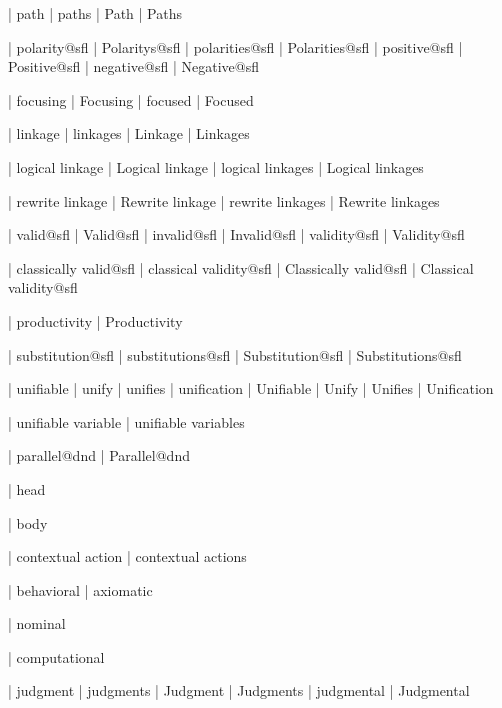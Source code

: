  | path
 | paths
 | Path
 | Paths

 | polarity@sfl
 | Polaritys@sfl
 | polarities@sfl
 | Polarities@sfl
 | positive@sfl
 | Positive@sfl
 | negative@sfl
 | Negative@sfl

 | focusing
 | Focusing
 | focused
 | Focused

 | linkage
 | linkages
 | Linkage
 | Linkages

 | logical linkage
 | Logical linkage
 | logical linkages
 | Logical linkages

 | rewrite linkage
 | Rewrite linkage
 | rewrite linkages
 | Rewrite linkages

 | valid@sfl
 | Valid@sfl
 | invalid@sfl
 | Invalid@sfl
 | validity@sfl
 | Validity@sfl

 | classically valid@sfl
 | classical validity@sfl
 | Classically valid@sfl
 | Classical validity@sfl

 | productivity
 | Productivity
 
 | substitution@sfl
 | substitutions@sfl
 | Substitution@sfl
 | Substitutions@sfl

 | unifiable
 | unify
 | unifies
 | unification
 | Unifiable
 | Unify
 | Unifies
 | Unification

 | unifiable variable
 | unifiable variables

 | parallel@dnd
 | Parallel@dnd




 | head

 | body

 | contextual action
 | contextual actions
 
 | behavioral
 | axiomatic

 | nominal

 | computational

 | judgment
 | judgments
 | Judgment
 | Judgments
 | judgmental
 | Judgmental

